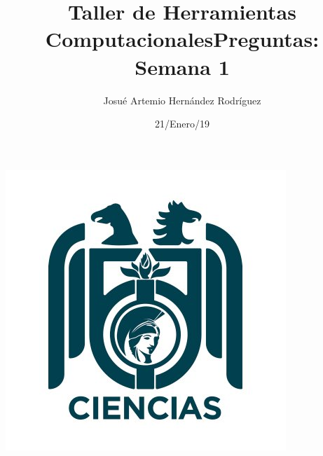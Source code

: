 \documentclass[letterpaper, 12pt, oneside]{article}%
\title{\Huge Taller de Herramientas Computacionales}
\author{Josué Artemio Hernández Rodríguez}%
\date{21/Enero/19}%
\begin{document}
\maketitle
\begin{center}%
\includegraphics[scale=.6]{3.jpg}%
\end{center}%
\newpage%

\title{\huge Preguntas: Semana 1\\}%
\end{document}
